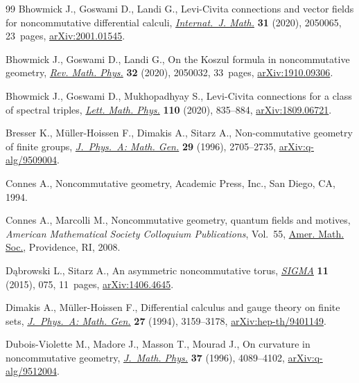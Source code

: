 \begin{thebibliography}{99}
Bhowmick J., Goswami D., Landi G., Levi-{C}ivita connections and vector fields
 for noncommutative differential calculi, \href{https://doi.org/10.1142/S0129167X20500652}{\textit{Internat.~J. Math.}}
 \textbf{31} (2020), 2050065, 23~pages, \href{https://arxiv.org/abs/2001.01545}{arXiv:2001.01545}.

Bhowmick J., Goswami D., Landi G., On the {K}oszul formula in noncommutative
 geometry, \href{https://doi.org/10.1142/S0129055X20500324}{\textit{Rev. Math. Phys.}} \textbf{32} (2020), 2050032, 33~pages,
 \href{https://arxiv.org/abs/1910.09306}{arXiv:1910.09306}.

Bhowmick J., Goswami D., Mukhopadhyay S., Levi-{C}ivita connections for a class
 of spectral triples, \href{https://doi.org/10.1007/s11005-019-01241-4}{\textit{Lett. Math. Phys.}} \textbf{110} (2020),
 835--884, \href{https://arxiv.org/abs/1809.06721}{arXiv:1809.06721}.

Bresser K., M\"uller-Hoissen F., Dimakis A., Sitarz A., Non-commutative
 geometry of finite groups, \href{https://doi.org/10.1088/0305-4470/29/11/010}{\textit{J.~Phys.~A: Math. Gen.}} \textbf{29}
 (1996), 2705--2735, \href{https://arxiv.org/abs/q-alg/9509004}{arXiv:q-alg/9509004}.

Connes A., Noncommutative geometry, Academic Press, Inc., San Diego, CA, 1994.

Connes A., Marcolli M., Noncommutative geometry, quantum fields and motives,
 \textit{American Mathematical Society Colloquium Publications}, Vol.~55,
 \href{https://doi.org/10.1090/coll/055}{Amer. Math. Soc.}, Providence, RI, 2008.

D\k{a}browski L., Sitarz A., An asymmetric noncommutative torus, \href{https://doi.org/10.3842/SIGMA.2015.075}{\textit{SIGMA}}
 \textbf{11} (2015), 075, 11~pages, \href{https://arxiv.org/abs/1406.4645}{arXiv:1406.4645}.

Dimakis A., M\"uller-Hoissen F., Differential calculus and gauge theory on
 finite sets, \href{https://doi.org/10.1088/0305-4470/27/9/028}{\textit{J.~Phys.~A: Math. Gen.}} \textbf{27} (1994), 3159--3178,
 \href{https://arxiv.org/abs/hep-th/9401149}{arXiv:hep-th/9401149}.

Dubois-Violette M., Madore J., Masson T., Mourad J., On curvature in
 noncommutative geometry, \href{https://doi.org/10.1063/1.531618}{\textit{J.~Math. Phys.}} \textbf{37} (1996),
 4089--4102, \href{https://arxiv.org/abs/q-alg/9512004}{arXiv:q-alg/9512004}.


\end{thebibliography}
